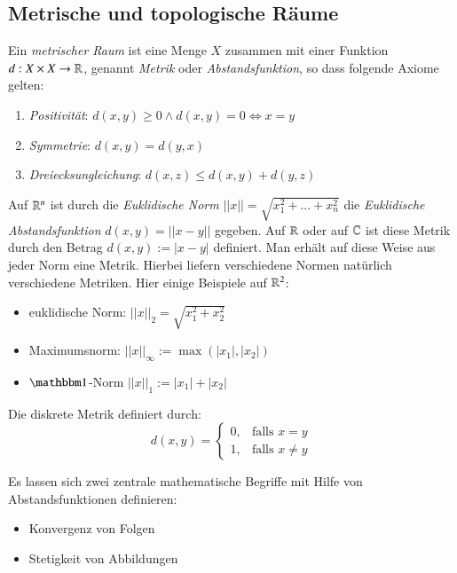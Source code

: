 \documentclass[a4paper,10pt]{scrartcl}
\renewcommand{\equiv}{\Longleftrightarrow}
\begin{document}
\subsection{Metrische und topologische Räume}
\begin{df}
Ein \emph{metrischer Raum} ist eine Menge $X$ zusammen mit einer Funktion $d: X \times X \rightarrow \mathbb{R}$, genannt \emph{Metrik} oder \emph{Abstandsfunktion}, so dass folgende Axiome gelten:
\begin{enumerate}
\item \emph{Positivität}: $d(x,y)\ge 0 \land d(x,y)=0\equiv x=y$
\item \emph{Symmetrie}: $d(x,y)=d(y,x)$
\item \emph{Dreiecksungleichung}: $d(x,z) \le d(x,y)+d(y,z)$
\end{enumerate}
\end{df}
\begin{ex*}
Auf $\mathbb{R}^n$ ist durch die \emph{Euklidische Norm} $||x||=\sqrt{x_1^2+...+x_n^2}$ die \emph{Euklidische Abstandsfunktion} $d(x,y)=||x-y||$ gegeben. Auf $\mathbb{R}$ oder auf $\mathbb{C}$ ist diese Metrik durch den Betrag $d(x,y):=|x-y|$ definiert.  Man erhält auf diese Weise aus jeder Norm eine Metrik. Hierbei liefern verschiedene Normen natürlich verschiedene Metriken. Hier einige Beispiele auf $\mathbb{R}^2$:
\begin{itemize} 
\item euklidische Norm: $||x||_2=\sqrt{x_1^2+x_2^2}$
\item Maximumsnorm: $||x||_\infty := \max(|x_1|, |x_2|)$
\item $\Eins$-Norm $||x||_1 := |x_1|+|x_2|$
\end{itemize}
\end{ex*}

\begin{ex*}
Die diskrete Metrik definiert durch:
\[
d(x,y)=\begin{cases}
  0, & \text{falls } x=y \\ 1, & \text{falls } x\neq y
\end{cases}
\]
\end{ex*}

Es lassen sich zwei zentrale mathematische Begriffe mit Hilfe von Abstandsfunktionen definieren:
\begin{itemize}
\item Konvergenz von Folgen
\item Stetigkeit von Abbildungen
\end{itemize}
\end{document}
